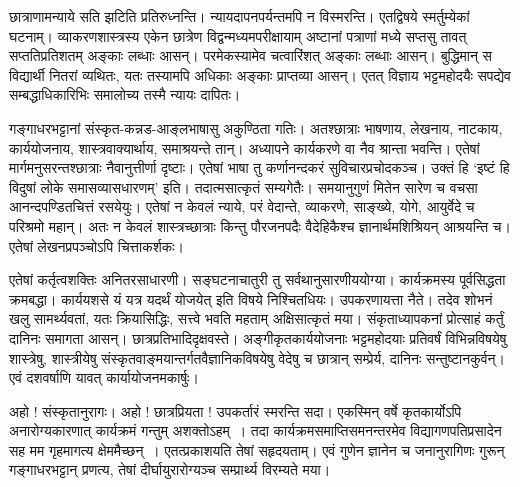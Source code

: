 {छात्राणामन्याये सति झटिति प्रतिरुध्नन्ति। न्यायदापनपर्यन्तमपि न विस्मरन्ति। एतद्विषये स्मर्तुम्येकां घटनाम्। व्याकरणशास्त्रस्य एकेन छात्रेण विद्वन्मध्यमपरीक्षायाम् अष्टानां पत्राणां मध्ये सप्तसु तावत् सप्ततिप्रतिशतम् अङ्काः लब्धाः आसन्। परमेकस्यामेव चत्वारिंशत् अङ्काः लब्धाः आसन्। बुद्धिमान् स विद्यार्थी नितरां व्यथितः, यतः तस्यामपि अधिकाः अङ्काः प्राप्तव्या आसन्। एतत् विज्ञाय भट्टमहोदयैः सपद्येव सम्बद्धाधिकारिभिः समालोच्य तस्मै न्यायः दापितः। 

गङ्गाधरभट्टानां संस्कृत-कन्नड-आङ्लभाषासु अकुण्ठिता गतिः। अतश्छात्राः भाषणाय, लेखनाय, नाटकाय, कार्ययोजनाय, शास्त्रवाक्यार्थाय, समाश्रयन्ते तान्। अध्यापने कार्यकरणे वा नैव श्रान्ता भवन्ति। एतेषां मार्गमनुसरन्तश्छात्राः नैवानुत्तीर्णा दृष्टाः। एतेषां भाषा तु कर्णानन्दकरं सुविचारप्रचोदकञ्च। उक्तं हि ‘इष्टं हि विदुषां लोके समासव्यासधारणम्’ इति। तदात्मसात्कृतं सम्यगेतैः। समयानुगुणं मितेन सारेण च वचसा आनन्दपण्डितचित्तं रसयेयुः। एतेषां न केवलं न्याये, परं वेदान्ते, व्याकरणे, साङ्ख्ये, योगे, आयुर्वेदे च परिश्रमो महान्। अतः न केवलं शास्त्रच्छात्राः किन्तु पौरजनपदैः वैदेहिकैश्च ज्ञानार्थमशिश्रियन् आश्रयन्ति च। एतेषां लेखनप्रपञ्चोऽपि चित्ताकर्शकः। 

एतेषां कर्तृत्वशक्तिः अनितरसाधारणी। सङ्घटनाचातुरी तु सर्वथानुसारणीययोग्या। कार्यक्रमस्य पूर्वसिद्धता क्रमबद्धा। कार्ययशसे यं यत्र यदर्थं योजयेत् इति विषये निश्चितधियः। उपकरणायत्ता नैते। तदेव शोभनं खलु सामर्थ्यवतां, यतः क्रियासिद्धिः, सत्त्वे भवति महताम् अक्षिसात्कृतं मया। संकृताध्यापकनां प्रोत्साहं कर्तुं दानिनः समागता आसन्। छात्रप्रतिभादिदृक्षवस्ते। अङ्गीकृतकार्ययोजनाः भट्टमहोदयाः प्रतिवर्षं विभिन्नविषयेषु शास्त्रेषु, शास्त्रीयेषु  संस्कृतवाङ्मयान्तर्गतवैज्ञानिकविषयेषु वेदेषु च छात्रान् सम्प्रेर्य, दानिनः सन्तुष्टानकुर्वन्। एवं दशवर्षाणि यावत् कार्यायोजनमकार्षुः। 

अहो ! संस्कृतानुरागः। अहो ! छात्रप्रियता ! उपकर्तारं स्मरन्ति सदा। एकस्मिन् वर्षे कृतकार्योऽपि अनारोग्यकारणात् कार्यक्रमं गन्तुम् अशक्तोऽहम्~। तदा कार्यक्रमसमाप्तिसमनन्तरमेव विद्यागणपतिप्रसादेन सह मम गृहमागत्य क्षेममैच्छन्~। एतत्प्रकाशयति तेषां सहृदयताम्। एवं गुणेन ज्ञानेन च जनानुरागिणः गुरून् गङ्गाधरभट्टान् प्रणत्य, तेषां दीर्घायुरारोग्यञ्च सम्प्रार्थ्य विरम्यते मया।  

\articleend
}
